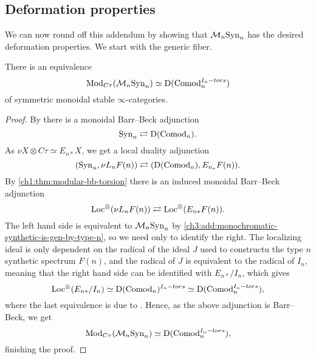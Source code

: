 \subsection{Deformation properties}

We can now round off this addendum by showing that $\mathcal{M}_{n}\mathrm{Syn}_n$ has the desired deformation properties. We start with the generic fiber. 

\begin{lemma}
    \label{ch3:add:lm:monochromatic-synthetic-special-fiber}
    There is an equivalence
    \[\mathrm{Mod}_{C\tau}(\mathcal{M}_{n}\mathrm{Syn}_n) \simeq \mathrm{D}(\mathrm{Comod}_n^{I_n-tors})\]
    of symmetric monoidal stable $\infty$-categories. 
\end{lemma}
\begin{proof}
    By \citeme there is a monoidal Barr--Beck adjunction 
    \[\mathrm{Syn}_n \rightleftarrows \mathrm{D}(\mathrm{Comod}_n).\]
    As $\nu X \otimes C\tau \simeq E_{n*} X$, we get a local duality adjunction 
    \[(\mathrm{Syn}_n, \nu L_n F(n))\rightleftarrows (\mathrm{D}(\mathrm{Comod}_n), E_{n_*}F(n)).\]
    By \cref{ch1:thm:modular-bb-torsion} there is an induced monoidal Barr--Beck adjunction 
    \[\operatorname{Loc}^\otimes(\nu L_n F(n))\rightleftarrows \operatorname{Loc}^\otimes(E_{n*}F(n)).\]
    The left hand side is equivalent to $\mathcal{M}_{n}\mathrm{Syn}_n$ by \cref{ch3:add:monochromatic-synthetic-is-gen-by-type-n}, so we need only to identify the right. The localizing ideal is only dependent on the radical of the ideal $J$ used to constructu the type $n$ synthetic spectrum $F(n)$, and the radical of $J$ is equivalent to the radical of $I_n$, meaning that the right hand side can be identified with $E_{n*}/I_n$, which gives 
    \[\operatorname{Loc}^\otimes(E_{n*}/I_n) \simeq \mathrm{D}(\mathrm{Comod}_n)^{I_n-tors}\simeq \mathrm{D}(\mathrm{Comod}_n^{I_n-tors}),\]
    where the last equivalence is due to \cite[3.7(2)]{barthel-heard-valenzuela_2020}. Hence, as the above adjunction is Barr--Beck, we get 
    \[\mathrm{Mod}_{C\tau}(\mathcal{M}_{n}\mathrm{Syn}_n) \simeq \mathrm{D}(\mathrm{Comod}_n^{I_n-tors}),\]
    finishing the proof. 
\end{proof}


